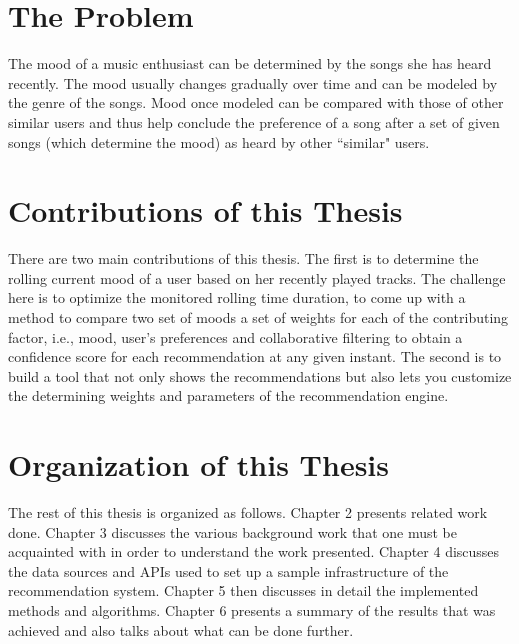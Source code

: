 	\section{The Problem}
		The mood of a music enthusiast can be determined by the songs she has heard recently. The mood usually changes gradually over time and can be modeled by the genre of the songs. Mood once modeled can be compared with those of other similar users and thus help conclude the preference of a song after a set of given songs (which determine the mood) as heard by other ``similar" users.

	\section{Contributions of this Thesis}
		There are two main contributions of this thesis. The first is to determine the rolling current mood of a user based on her recently played tracks. The challenge here is to optimize the monitored rolling time duration, to come up with a method to compare two set of moods a set of weights for each of the contributing factor, i.e., mood, user's preferences and collaborative filtering to obtain a confidence score for each recommendation at any given instant. The second is to build a tool that not only shows the recommendations but also lets you customize the determining weights and parameters of the recommendation engine.

	\section{Organization of this Thesis}
		The rest of this thesis is organized as follows. Chapter 2 presents related work done. Chapter 3 discusses the various background work that one must be acquainted with in order to understand the work presented. Chapter 4 discusses the data sources and APIs used to set up a sample infrastructure of the recommendation system. Chapter 5 then discusses in detail the implemented methods and algorithms. Chapter 6 presents a summary of the results that was achieved and also talks about what can be done further.
